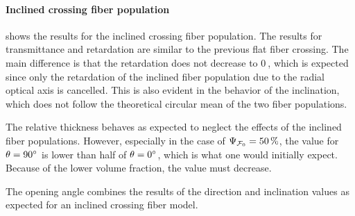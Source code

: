 \paragraph{Inclined crossing fiber population}
 shows the results for the inclined crossing fiber population.
The results for transmittance and retardation are similar to the previous flat fiber crossing.
The main difference is that the retardation does not decrease to $\SI{0}{}$, which is expected since only the retardation of the inclined fiber population due to the radial optical axis is cancelled.
This is also evident in the behavior of the inclination, which does not follow the theoretical circular mean of the two fiber populations.
\par
% 
The relative thickness \trel{} behaves as expected to neglect the effects of the inclined fiber populations.
However, especially in the case of $\textnormal{$\Psi_{\textnormal{$\mathcal{F}_0$}}$}=\SI{50}{\percent}$, the \trel{} value for $\textnormal{$\theta$}=\SI{90}{\degree}$ is lower than half of $\textnormal{$\theta$}=\SI{0}{\degree}$, which is what one would initially expect.
Because of the lower volume fraction, the \trel{} value must decrease.
\par
%
The opening angle \openingAngle{} combines the results of the direction and inclination values as expected for an inclined crossing fiber model.
% 
%
%
